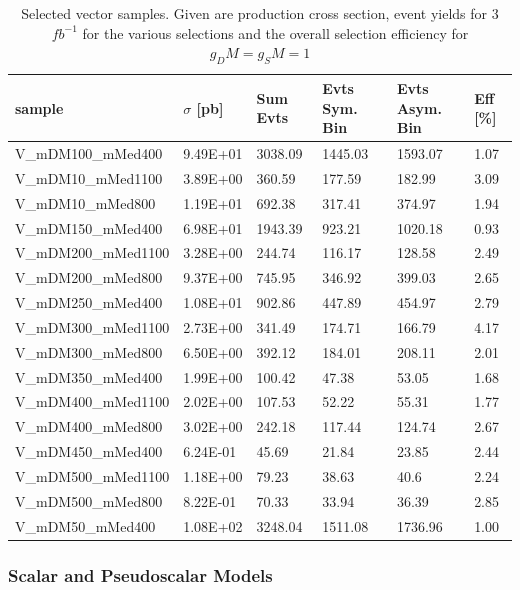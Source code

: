 \begin{table}[h]
\centering
\begin{tabular}{llllll}
\hline
sample             & $\sigma$ [pb] & Sum Evts       & Evts Sym. Bin & Evts Asym. Bin & Eff  [\%]   \\\hline
V\_mDM100\_mMed400  & 9.49E+01 & 3038.09 & 1445.03 & 1593.07 & 1.07 \\
V\_mDM10\_mMed1100  & 3.89E+00 & 360.59  & 177.59  & 182.99  & 3.09 \\
V\_mDM10\_mMed800   & 1.19E+01 & 692.38  & 317.41  & 374.97  & 1.94 \\
V\_mDM150\_mMed400  & 6.98E+01 & 1943.39 & 923.21  & 1020.18 & 0.93 \\
V\_mDM200\_mMed1100 & 3.28E+00 & 244.74  & 116.17  & 128.58  & 2.49 \\
V\_mDM200\_mMed800  & 9.37E+00 & 745.95  & 346.92  & 399.03  & 2.65 \\
V\_mDM250\_mMed400  & 1.08E+01 & 902.86  & 447.89  & 454.97  & 2.79 \\
V\_mDM300\_mMed1100 & 2.73E+00 & 341.49  & 174.71  & 166.79  & 4.17 \\
V\_mDM300\_mMed800  & 6.50E+00 & 392.12  & 184.01  & 208.11  & 2.01 \\
V\_mDM350\_mMed400  & 1.99E+00 & 100.42  & 47.38   & 53.05   & 1.68 \\
V\_mDM400\_mMed1100 & 2.02E+00 & 107.53  & 52.22   & 55.31   & 1.77 \\
V\_mDM400\_mMed800  & 3.02E+00 & 242.18  & 117.44  & 124.74  & 2.67 \\
V\_mDM450\_mMed400  & 6.24E-01 & 45.69   & 21.84   & 23.85   & 2.44 \\
V\_mDM500\_mMed1100 & 1.18E+00 & 79.23   & 38.63   & 40.6    & 2.24 \\
V\_mDM500\_mMed800  & 8.22E-01 & 70.33   & 33.94   & 36.39   & 2.85 \\
V\_mDM50\_mMed400   & 1.08E+02 & 3248.04 & 1511.08 & 1736.96 & 1.00 \\
\hline
\end{tabular}
\caption{Selected vector samples. Given are production cross section, event yields for 3 $fb^{-1 }$ for the various selections and the overall selection efficiency for $g_DM=g_SM=1$}
\label{tab:dm_V_g1_3fb}
\end{table}

\subsubsection{Scalar and Pseudoscalar Models} \label{sec:dm_pscalar}


